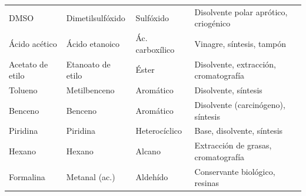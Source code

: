\begin{longtable}{L{3.5cm} L{4.5cm} L{3.5cm} L{6.0cm}}
DMSO             & Dimetilsulfóxido     & Sulfóxido       & Disolvente polar aprótico, criogénico \\
Ácido acético    & Ácido etanoico       & Ác. carboxílico & Vinagre, síntesis, tampón \\
Acetato de etilo & Etanoato de etilo    & Éster           & Disolvente, extracción, cromatografía \\
Tolueno          & Metilbenceno         & Aromático       & Disolvente, síntesis \\
Benceno          & Benceno              & Aromático       & Disolvente (carcinógeno), síntesis \\
Piridina         & Piridina             & Heterocíclico   & Base, disolvente, síntesis \\
Hexano           & Hexano               & Alcano          & Extracción de grasas, cromatografía \\
Formalina        & Metanal (ac.)        & Aldehído        & Conservante biológico, resinas \\
\end{longtable}

\restoregeometry


